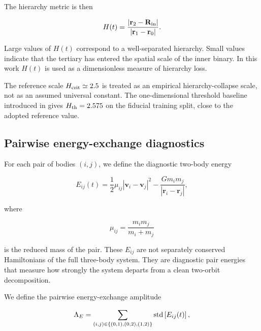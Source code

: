 \documentclass[12pt,a4paper]{article}
\newcommand{\Hcrit}{H_{\rm crit}}
\newcommand{\Eij}{E_{ij}}
\newcommand{\Rin}{\mathbf{R}_{\rm in}}
\begin{document}
The hierarchy metric is then

\begin{equation}
    H(t) =
    \frac{|\mathbf r_2-\Rin|}
         {|\mathbf r_1-\mathbf r_0|}.
    \label{eq:H_metric}
\end{equation}

Large values of \(H(t)\) correspond to a well-separated hierarchy. Small values indicate that the tertiary has entered the spatial scale of the inner binary. In this work \(H(t)\) is used as a dimensionless measure of hierarchy loss.

The reference scale \(\Hcrit\simeq2.5\) is treated as an empirical hierarchy-collapse scale, not as an assumed universal constant. The one-dimensional threshold baseline introduced in  gives \(H_{\rm th}=2.575\) on the fiducial training split, close to the adopted reference value.

\subsection{Pairwise energy-exchange diagnostics}
\label{sec:pairwise_energy}

For each pair of bodies \((i,j)\), we define the diagnostic two-body energy

\begin{equation}
    \Eij(t)
    =
    \frac{1}{2}\mu_{ij}|\mathbf v_i-\mathbf v_j|^2
    -
    \frac{Gm_im_j}{|\mathbf r_i-\mathbf r_j|},
    \label{eq:pair_energy}
\end{equation}

where

\begin{equation}
    \mu_{ij} = \frac{m_im_j}{m_i+m_j}
\end{equation}

is the reduced mass of the pair. These \(\Eij\) are not separately conserved Hamiltonians of the full three-body system. They are diagnostic pair energies that measure how strongly the system departs from a clean two-orbit decomposition.

We define the pairwise energy-exchange amplitude

\begin{equation}
    \Lambda_E =
    \sum_{(i,j)\in\{(0,1),(0,2),(1,2)\}}
    {\rm std}\left[E_{ij}(t)\right],
    \label{eq:energy_exchange}
\end{equation}
\end{document}
